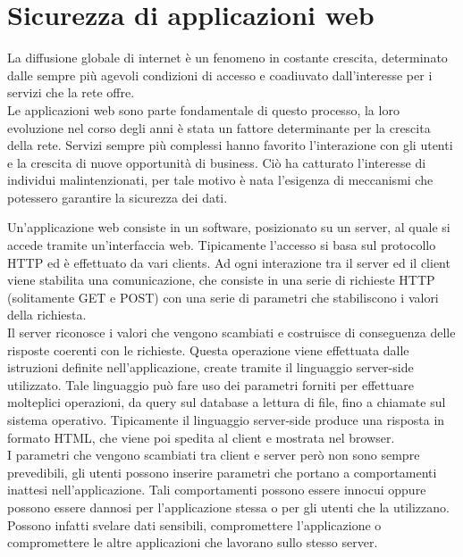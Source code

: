 \chapter{Sicurezza di applicazioni web}

\begin{epigraphs}
\end{epigraphs}

La diffusione globale di internet è un fenomeno in costante crescita, determinato dalle sempre più agevoli condizioni di accesso e coadiuvato dall'interesse per i servizi che la rete offre. \\
Le applicazioni web sono parte fondamentale di questo processo, la loro evoluzione nel corso degli anni è stata un fattore determinante per la crescita della rete. Servizi sempre più complessi hanno favorito l'interazione con gli utenti e la crescita di nuove opportunità di business. Ciò ha catturato l'interesse di individui malintenzionati, per tale motivo è nata l'esigenza di meccanismi che potessero garantire la sicurezza dei dati.

Un'applicazione web consiste in un software, posizionato su un server, al quale si accede tramite un'interfaccia web. Tipicamente l'accesso si basa sul protocollo HTTP ed è effettuato da vari clients. Ad ogni interazione tra il server ed il client viene stabilita una comunicazione, che consiste in una serie di richieste HTTP (solitamente GET e POST) con una serie di parametri che stabiliscono i valori della richiesta.\\
Il server riconosce i valori che vengono scambiati e costruisce di conseguenza delle risposte coerenti con le richieste. Questa operazione viene effettuata dalle istruzioni definite nell'applicazione, create tramite il linguaggio server-side utilizzato. Tale linguaggio può fare uso dei parametri forniti per effettuare molteplici operazioni, da query sul database a lettura di file, fino a chiamate sul sistema operativo. Tipicamente il linguaggio server-side produce una risposta in formato HTML, che viene poi spedita al client e mostrata nel browser.\\
I parametri che vengono scambiati tra client e server però non sono sempre prevedibili, gli utenti possono inserire parametri che portano a comportamenti inattesi nell'applicazione. Tali comportamenti possono essere innocui oppure possono essere dannosi per l'applicazione stessa o per gli utenti che la utilizzano. Possono infatti svelare dati sensibili, compromettere l'applicazione o compromettere le altre applicazioni che lavorano sullo stesso server. 

